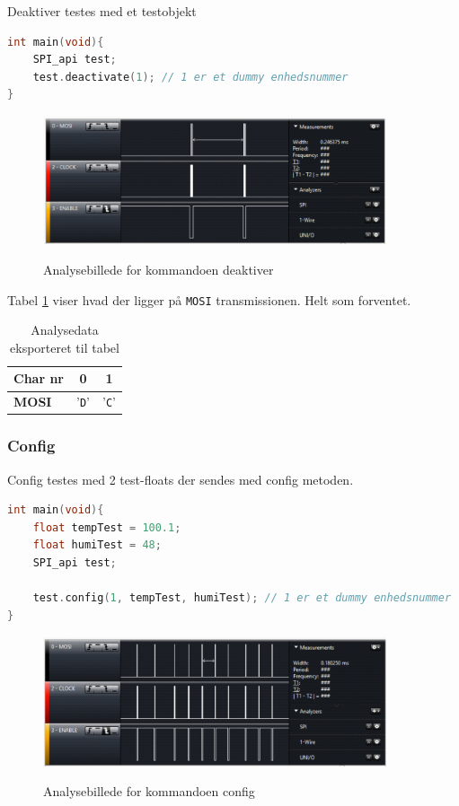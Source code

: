 Deaktiver testes med et testobjekt

\begin{lstlisting}[language=C]
int main(void){
	SPI_api test;
	test.deactivate(1); // 1 er et dummy enhedsnummer
}
\end{lstlisting}

\begin{figure}[H]
\centering
{\includegraphics[width=0.90\textwidth]{filer/modultest/Billeder/mt_deactivate}}
\caption{Analysebillede for kommandoen deaktiver}
\label{lab:mt_deactivate}
\end{figure}

Tabel \ref{table:mt_deactivate} viser hvad der ligger på \verb+MOSI+ transmissionen. Helt som forventet.

\begin{table}[h]
	\caption{Analysedata eksporteret til tabel}
	\centering
	\begin{tabular}{|l|c|c|}
		\hline 
		\textbf{Char nr} & \textbf{0} & \textbf{1} \\ 		
		\hline 
		\textbf{MOSI} & '\verb+D+' & '\verb+C+' \\ 
		\hline 
	\end{tabular} 
	\label{table:mt_deactivate}
\end{table}


\subsubsection*{Config}
Config testes med 2 test-floats der sendes med config metoden.

\begin{lstlisting}[language=C]
int main(void){
	float tempTest = 100.1;
	float humiTest = 48;
	SPI_api test;
	
	test.config(1, tempTest, humiTest); // 1 er et dummy enhedsnummer
}
\end{lstlisting}

\begin{figure}[H]
\centering
{\includegraphics[width=0.90\textwidth]{filer/modultest/Billeder/mt_config}}
\caption{Analysebillede for kommandoen config}
\label{lab:mt_config}
\end{figure}

